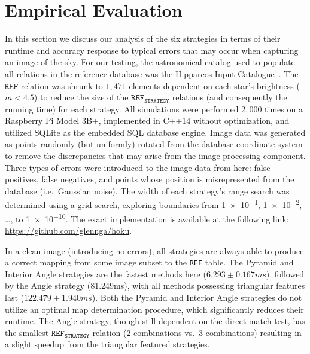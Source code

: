\newcommand{\AVG}{\mathit{AVG}}

\section{Empirical Evaluation}\label{sec:empiricalEvaluation}
In this section we discuss our analysis of the six strategies in terms of their runtime and accuracy response to typical errors that may occur when capturing an image of the sky.
For our testing, the astronomical catalog used to populate all relations in the reference database was the Hipparcos Input Catalogue~\cite{perryman:hipparcosCatalogue}. 
The $\texttt{REF}$ relation was shrunk to $1{,}471$ elements dependent on each star's brightness ($m < 4.5$) to reduce the size of the $\texttt{REF}_\texttt{STRATEGY}$ relations (and consequently the running time) for each strategy.
All simulations were performed $2{,}000$ times on a Raspberry Pi Model 3B+, implemented in C++14 without optimization, and utilized SQLite as the embedded SQL database engine.
Image data was generated as points randomly (but uniformly) rotated from the database coordinate system to remove the discrepancies that may arise from the image processing component.
Three types of errors were introduced to the image data from here: false positives, false negatives, and points whose position is misrepresented from the database (i.e.\ Gaussian noise).
The width of each strategy's range search was determined using a grid search, exploring boundaries from \num{1e-1}, \num{1e-2}, \ldots, to \num{1e-10}.
The exact implementation is available at the following link: \url{https://github.com/glennga/hoku}.

In a clean image (introducing no errors), all strategies are always able to produce a correct mapping from some image subset to the \texttt{REF} table.
The Pyramid and Interior Angle strategies are the fastest methods here ($6.293{\pm}0.167\si{ms}$), followed by the Angle strategy (81.249\si{ms}), with all methods possessing triangular features last ($122.479{\pm}1.940\si{ms}$).
Both the Pyramid and Interior Angle strategies do not utilize an optimal map determination procedure, which significantly reduces their runtime.
The Angle strategy, though still dependent on the direct-match test, has the smallest $\texttt{REF}_\texttt{STRATEGY}$ relation (2-combinations vs.\ 3-combinations) resulting in a slight speedup from the triangular featured strategies.

